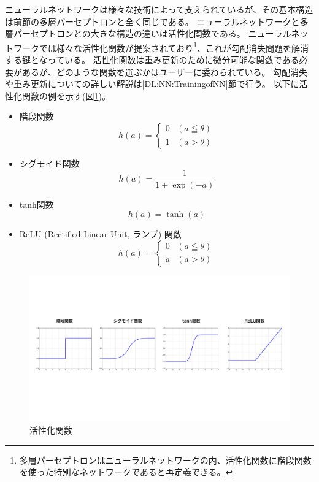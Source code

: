 ニューラルネットワークは様々な技術によって支えられているが、その基本構造は前節の多層パーセプトロンと全く同じである。
ニューラルネットワークと多層パーセプトロンとの大きな構造の違いは活性化関数である。
ニューラルネットワークでは様々な活性化関数が提案されており\footnote{多層パーセプトロンはニューラルネットワークの内、活性化関数に階段関数を使った特別なネットワークであると再定義できる。}、これが勾配消失問題を解消する鍵となっている。
活性化関数は重み更新のために微分可能な関数である必要があるが、どのような関数を選ぶかはユーザーに委ねられている。
勾配消失や重み更新についての詳しい解説は\ref{DL:NN:TrainingofNN}節で行う。
以下に活性化関数の例を示す(図\ref{5ActivationFunction})。
\begin{itemize}
  \item 階段関数
\begin{equation}
 h(a) = \left\{ \begin{array}{ll}
    0 & (a \leqq \theta) \\
    1 & (a > \theta)
 \end{array} \right.
\end{equation}
  \item シグモイド関数
\begin{equation}
 h(a) = \frac{1}{1+\exp{(-a)}}
\end{equation}
  \item tanh関数
\begin{equation}
 h(a) = \tanh{(a)}
\end{equation}
  \item ReLU (Rectified Linear Unit, ランプ) 関数\cite{ReLUpaper}
\begin{equation}
 h(a) = \left\{ \begin{array}{ll}
    0 & (a \leqq \theta) \\
    a & (a > \theta)
 \end{array} \right.
\end{equation}
\end{itemize}

\begin{figure}[htbp]
 \centering
 \includegraphics[trim = 0 250 0 250, width=1.0\textwidth, clip]{Figure/2DeepLearning/5ActivationFunction.png}
 \caption{活性化関数}
 \label{5ActivationFunction}
\end{figure}

